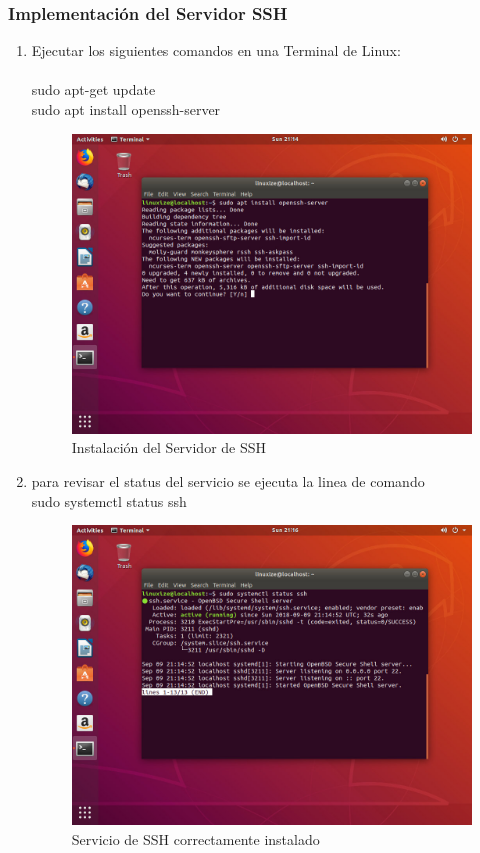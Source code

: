 \subsubsection{Implementación del Servidor SSH}
\begin{enumerate}
    \item Ejecutar los siguientes comandos en una Terminal de Linux:\\
     \\sudo apt-get update\\
     sudo apt install openssh-server\\
     \begin{figure}[H]
  \centering
    \includegraphics[scale=1]{imagenes/primero/1.png}
    \caption{Instalación del Servidor de SSH}
    \label{fig:http1}
\end{figure}
    \item para revisar el status del servicio se ejecuta la linea de comando\\
         sudo systemctl status ssh \\
         \begin{figure}[H]
  \centering
    \includegraphics[scale=1]{imagenes/primero/2.png}
    \caption{Servicio de SSH correctamente instalado}
    \label{fig:http1}
\end{figure}
\end{enumerate}
\newpage
\noindent
